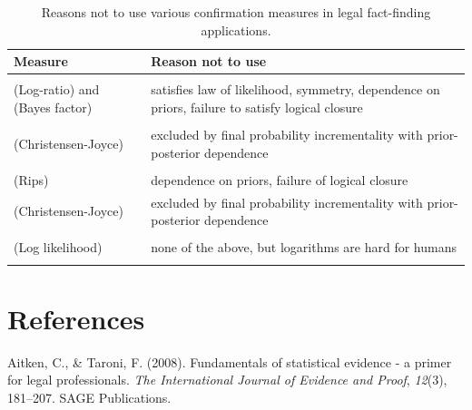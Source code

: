 \documentclass[10pt,dvipsnames,enabledeprecatedfontcommands]{scrartcl}
\begin{document}
\begin{table}
\centering\begingroup\fontsize{9}{11}\selectfont

\begin{tabular}{lp{10cm}}
\toprule
Measure & Reason not to use\\
\midrule
\cellcolor{gray!6}{(Difference)} & \cellcolor{gray!6}{dependence on priors, logical closure failure}\\
(Log-ratio) and (Bayes factor) & satisfies law of likelihood, symmetry, dependence on priors, failure to satisfy logical closure\\
\cellcolor{gray!6}{(Generalized entailment)} & \cellcolor{gray!6}{dependence on priors, independent conflicting evidence}\\
(Christensen-Joyce) & excluded by final probability incrementality with prior-posterior dependence\\
\cellcolor{gray!6}{(Carnap)} & \cellcolor{gray!6}{excluded by final probability incrementality with prior-posterior dependence, symmetry, logical closure failure}\\
(Rips) & dependence on priors, failure of logical closure\\
(Christensen-Joyce) & excluded by final probability incrementality with prior-posterior dependence\\
\cellcolor{gray!6}{(Kemeny-Oppenheim)} & \cellcolor{gray!6}{none of the above, but unnecessarily complex}\\
(Log likelihood) & none of the above, but logarithms are hard for humans\\
\cellcolor{gray!6}{(Likelihood ratio)} & \cellcolor{gray!6}{none of the above}\\
\bottomrule
\end{tabular}
\endgroup{}
\caption{Reasons not to use various confirmation measures in legal fact-finding applications.}
\label{tab:confirmation}
\end{table}

\section*{References}\label{references}

\hypertarget{refs}{}
\hypertarget{ref-aitken2008fundamentals}{}
Aitken, C., \& Taroni, F. (2008). Fundamentals of statistical evidence -
a primer for legal professionals. \emph{The International Journal of
Evidence and Proof}, \emph{12}(3), 181--207. SAGE Publications.
\end{document}
